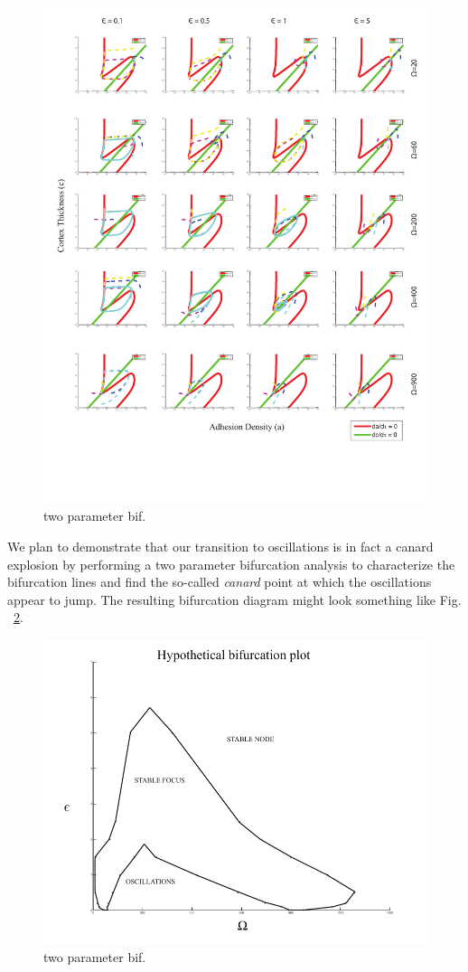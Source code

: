 \begin{figure}[h]
\centering
\captionsetup{width=\linewidth}
\includegraphics[width=4.5in]{Project2/figs/Epislon_omega.pdf}
\caption{two parameter bif.}
\label{fig::epsomega}
\end{figure}
 
We plan to demonstrate that our transition to oscillations is in fact a canard explosion by performing a two parameter bifurcation analysis to characterize the bifurcation lines and find the so-called {\textit{canard}} point at which the oscillations appear to jump. The resulting bifurcation diagram might look something like Fig. ~\ref{fig::bifplot}. 

\begin{figure}[h]
\centering
\captionsetup{width=\linewidth}
\includegraphics[width=4.5in]{Project2/figs/Hypothetical_bifurcation_plot.pdf}
\caption{two parameter bif.}
\label{fig::bifplot}
\end{figure}

